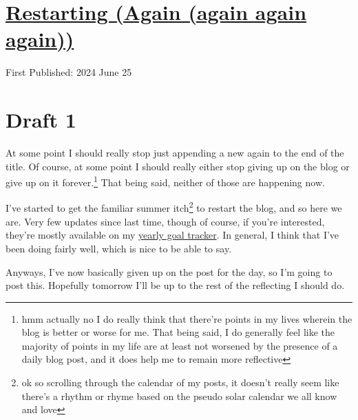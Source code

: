 \documentclass[12pt]{article}[titlepage]
\newcommand{\1}{\={a}}
\newcommand{\2}{\={e}}
\newcommand{\3}{\={\i}}
\newcommand{\4}{\=o}
\newcommand{\5}{\=u}
\newcommand{\6}{\={A}}
\renewcommand{\,}{\textsuperscript{,}}
\begin{document}
\doublespacing
\section{\href{restarting-again-again-again-again.html}{Restarting (Again (again again again))}}
First Published: 2024 June 25


\section{Draft 1}
At some point I should really stop just appending a new again to the end of the title.
Of course, at some point I should really either stop giving up on the blog or give up on it forever.\footnote{hmm actually no I do really think that there're points in my lives wherein the blog is better or worse for me. That being said, I do generally feel like the majority of points in my life are at least not worsened by the presence of a daily blog post, and it does help me to remain more reflective}
That being said, neither of those are happening now.

I've started to get the familiar summer itch\footnote{ok so scrolling through the calendar of my posts, it doesn't really seem like there's a rhythm or rhyme based on the pseudo solar calendar we all know and love} to restart the blog, and so here we are.
Very few updates since last time, though of course, if you're interested, they're mostly available on my \href{twenty-five.html}{yearly goal tracker}.
In general, I think that I've been doing fairly well, which is nice to be able to say.

Anyways, I've now basically given up on the post for the day, so I'm going to post this. Hopefully tomorrow I'll be up to the rest of the reflecting I should do.
\end{document}

